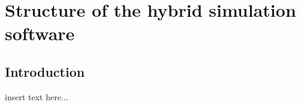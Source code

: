 \graphicspath{{chapt_dutch/}{intro/}{chapt2/}{chapt3/}{chapt4/}{chapt5/}{chapt6/}{chapt7/}}

\renewcommand\evenpagerightmark{{\scshape\small Appendix C}}
\renewcommand\oddpageleftmark{{\scshape\small Structure of the hybrid simulation software}}

\renewcommand{\bibname}{References}

\hyphenation{}

\chapter[Structure of the hybrid simulation software]%
{Structure of the hybrid simulation software}
\label{app3}

\section{Introduction}
insert text here...

\clearpage{\pagestyle{empty}\cleardoublepage}
